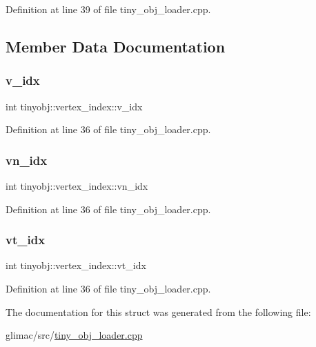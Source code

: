 Definition at line 39 of file tiny\+\_\+obj\+\_\+loader.\+cpp.



\subsection{Member Data Documentation}
\mbox{\label{structtinyobj_1_1vertex__index_a91a2616fb97e0da915a40654edf9b558}} 
\subsubsection{\texorpdfstring{v\+\_\+idx}{v\_idx}}
{\footnotesize\ttfamily int tinyobj\+::vertex\+\_\+index\+::v\+\_\+idx}



Definition at line 36 of file tiny\+\_\+obj\+\_\+loader.\+cpp.

\mbox{\label{structtinyobj_1_1vertex__index_a30f2a63a5ed20cc3ad64e340c4020da8}} 
\subsubsection{\texorpdfstring{vn\+\_\+idx}{vn\_idx}}
{\footnotesize\ttfamily int tinyobj\+::vertex\+\_\+index\+::vn\+\_\+idx}



Definition at line 36 of file tiny\+\_\+obj\+\_\+loader.\+cpp.

\mbox{\label{structtinyobj_1_1vertex__index_aae7e058d3aa0993aa05e95d82dd6b8bf}} 
\subsubsection{\texorpdfstring{vt\+\_\+idx}{vt\_idx}}
{\footnotesize\ttfamily int tinyobj\+::vertex\+\_\+index\+::vt\+\_\+idx}



Definition at line 36 of file tiny\+\_\+obj\+\_\+loader.\+cpp.



The documentation for this struct was generated from the following file\+:\begin{DoxyCompactItemize}
\item 
glimac/src/\hyperlink{tiny__obj__loader_8cpp}{tiny\+\_\+obj\+\_\+loader.\+cpp}\end{DoxyCompactItemize}
